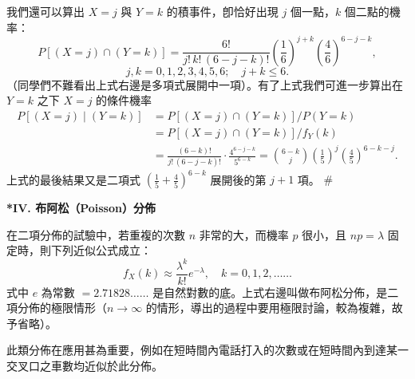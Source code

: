 \begin{example}
我們還可以算出 $X = j$ 與 $Y = k$ 的積事件，卽恰好出現 $j$ 個一點，$k$ 個二點的機率：
\[
P[(X = j) \cap (Y = k)] = \frac{6!}{j!\, k!\, (6 - j - k)!} \left(\frac{1}{6}\right)^{j+k} \left(\frac{4}{6}\right)^{6-j-k},
\]
\[
j, k = 0, 1, 2, 3, 4, 5, 6; \quad j + k \le 6.
\]
（同學們不難看出上式右邊是多項式展開中一項）。有了上式我們可進一步算出在 $Y = k$ 之下 $X = j$ 的條件機率
\begin{align*}
P[(X = j) \mid (Y = k)] &= P[(X = j) \cap (Y = k)] / P(Y = k) \\
&= P[(X = j) \cap (Y = k)] / f_Y(k) \\
&= \frac{(6 - k)!}{j!\, (6 - j - k)!} \cdot \frac{4^{6-j-k}}{5^{6-k}} = \binom{6 - k}{j} \left(\frac{1}{5}\right)^j \left(\frac{4}{5}\right)^{6-k-j}.
\end{align*}
上式的最後結果又是二項式 $\left(\frac{1}{5} + \frac{4}{5}\right)^{6-k}$ 展開後的第 $j+1$ 項。 \hfill $\#$
\end{example}

\medskip
\noindent\textbf{*IV. 布阿松（Poisson）分佈}

在二項分佈的試驗中，若重複的次數 $n$ 非常的大，而機率 $p$ 很小，且 $np = \lambda$ 固定時，則下列近似公式成立：
\begin{equation}
f_X(k) \approx \frac{\lambda^k}{k!} e^{-\lambda}, \quad k = 0, 1, 2, \dots\dots \label{eq:b5s-ch5-3}
\end{equation}
式中 $e$ 為常數 $= 2.71828\dots\dots$ 是自然對數的底。上式右邊叫做布阿松分佈，是二項分佈的極限情形（$n \to \infty$ 的情形，導出的過程中要用極限討論，較為複雜，故予省略）。

此類分佈在應用甚為重要，例如在短時間內電話打入的次數或在短時間內到達某一交叉口之車數均近似於此分佈。

